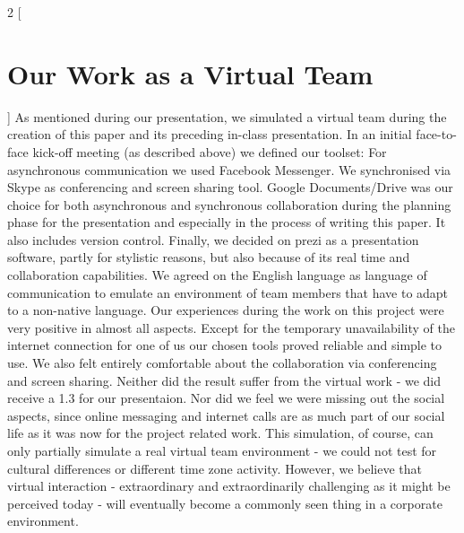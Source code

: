 \begin{multicols}{2}
[\section{Our Work as a Virtual Team}]
As mentioned during our presentation, we simulated a virtual team during the creation of this paper and its preceding in-class presentation. In an initial face-to-face kick-off meeting (as described above) we defined our toolset: For asynchronous communication we used Facebook Messenger. We synchronised via Skype as conferencing and screen sharing tool. Google Documents/Drive was our choice for both asynchronous and synchronous collaboration during the planning phase for the presentation and especially in the process of writing this paper. It also includes version control. Finally, we decided on prezi as a presentation software, partly for stylistic reasons, but also because of its real time and collaboration capabilities. We agreed on the English language as language of communication to emulate an environment of team members that have to adapt to a non-native language.
Our experiences during the work on this project were very positive in almost all aspects. Except for the temporary unavailability of the internet connection for one of us our chosen tools proved reliable and simple to use. We also felt entirely comfortable about the collaboration via conferencing and screen sharing. Neither did the result suffer from the virtual work - we did receive a 1.3 for our presentaion. Nor did we feel we were missing out the social aspects, since online messaging and internet calls are as much part of our social life as it was now for the project related work.
This simulation, of course, can only partially simulate a real virtual team environment - we could not test for cultural differences or different time zone activity. However, we believe that virtual interaction - extraordinary and extraordinarily challenging as it might be perceived today - will eventually become a commonly seen thing in a corporate environment.
\end{multicols}